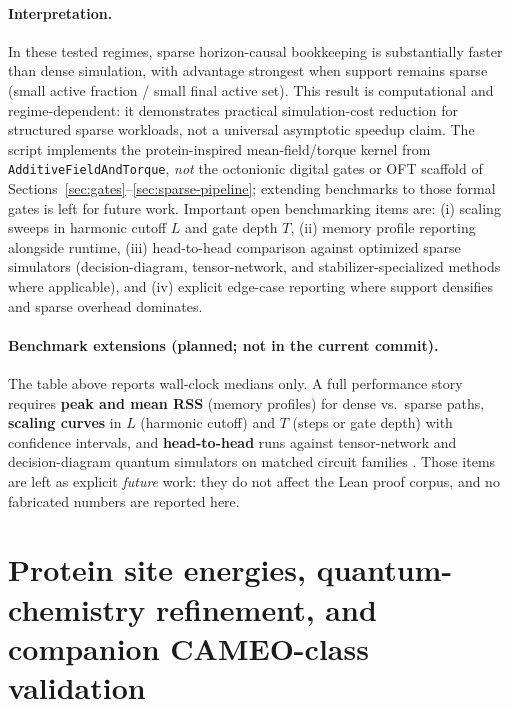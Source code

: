 \documentclass[11pt,a4paper]{article}
\theoremstyle{remark}
\begin{document}
\paragraph{Interpretation.}
In these tested regimes, sparse horizon-causal bookkeeping is substantially faster than dense simulation, with advantage strongest when support remains sparse (small active fraction / small final active set). This result is computational and regime-dependent: it demonstrates practical simulation-cost reduction for structured sparse workloads, not a universal asymptotic speedup claim. The script implements the protein-inspired mean-field/torque kernel from \texttt{AdditiveFieldAndTorque}, \emph{not} the octonionic digital gates or OFT scaffold of Sections~\ref{sec:gates}--\ref{sec:sparse-pipeline}; extending benchmarks to those formal gates is left for future work.
Important open benchmarking items are: (i) scaling sweeps in harmonic cutoff $L$ and gate depth $T$, (ii) memory profile reporting alongside runtime, (iii) head-to-head comparison against optimized sparse simulators (decision-diagram, tensor-network, and stabilizer-specialized methods where applicable), and (iv) explicit edge-case reporting where support densifies and sparse overhead dominates.

\paragraph{Benchmark extensions (planned; not in the current commit).}
The table above reports wall-clock medians only. A full performance story requires \textbf{peak and mean RSS} (memory profiles) for dense vs.\ sparse paths, \textbf{scaling curves} in $L$ (harmonic cutoff) and $T$ (steps or gate depth) with confidence intervals, and \textbf{head-to-head} runs against tensor-network and decision-diagram quantum simulators on matched circuit families \cite{sparsesim2024,sun2025}. Those items are left as explicit \emph{future} work: they do not affect the Lean proof corpus, and no fabricated numbers are reported here.

\section{Protein site energies, quantum-chemistry refinement, and companion CAMEO-class validation}
\end{document}
